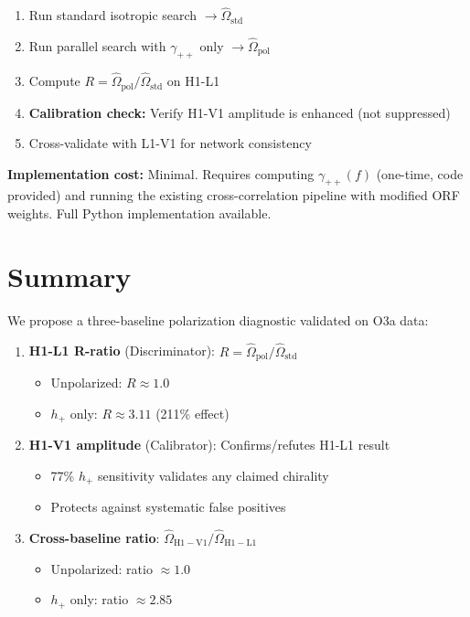 \documentclass[twocolumn,prd,superscriptaddress,nofootinbib]{revtex4-2}
\begin{document}
\begin{enumerate}
\item Run standard isotropic search $\rightarrow \hat{\Omega}_{\mathrm{std}}$
\item Run parallel search with $\gamma_{++}$ only $\rightarrow \hat{\Omega}_{\mathrm{pol}}$
\item Compute $R = \hat{\Omega}_{\mathrm{pol}} / \hat{\Omega}_{\mathrm{std}}$ on H1-L1
\item \textbf{Calibration check:} Verify H1-V1 amplitude is enhanced (not suppressed)
\item Cross-validate with L1-V1 for network consistency
\end{enumerate}

\textbf{Implementation cost:} Minimal. Requires computing $\gamma_{++}(f)$ (one-time, code provided) and running the existing cross-correlation pipeline with modified ORF weights. Full Python implementation available.

\section{Summary}

We propose a three-baseline polarization diagnostic validated on O3a data:

\begin{enumerate}
\item \textbf{H1-L1 R-ratio} (Discriminator): $R = \hat{\Omega}_{\mathrm{pol}}/\hat{\Omega}_{\mathrm{std}}$
\begin{itemize}
\item Unpolarized: $R \approx 1.0$
\item $h_+$ only: $R \approx 3.11$ (211\% effect)
\end{itemize}

\item \textbf{H1-V1 amplitude} (Calibrator): Confirms/refutes H1-L1 result
\begin{itemize}
\item 77\% $h_+$ sensitivity validates any claimed chirality
\item Protects against systematic false positives
\end{itemize}

\item \textbf{Cross-baseline ratio}: $\hat{\Omega}_{\mathrm{H1-V1}}/\hat{\Omega}_{\mathrm{H1-L1}}$
\begin{itemize}
\item Unpolarized: ratio $\approx 1.0$
\item $h_+$ only: ratio $\approx 2.85$
\end{itemize}
\end{enumerate}
\end{document}
